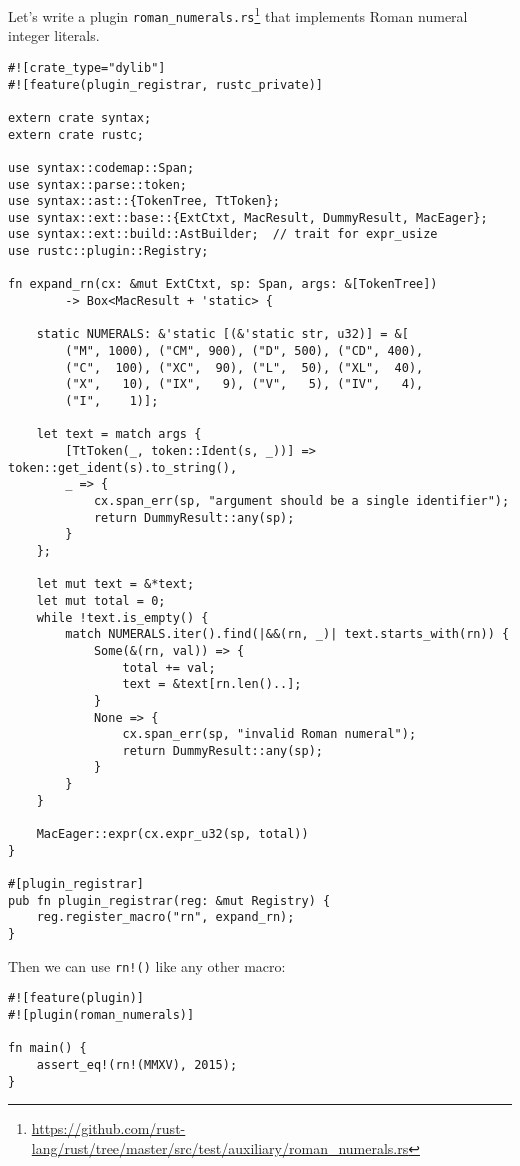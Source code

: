 \documentclass[a4paper,]{book}
\renewcommand{\href}[2]{#2\footnote{\url{#1}}}
\begin{document}
Let's write a plugin
\href{https://github.com/rust-lang/rust/tree/master/src/test/auxiliary/roman_numerals.rs}{\texttt{roman\_numerals.rs}}
that implements Roman numeral integer literals.

\begin{verbatim}
#![crate_type="dylib"]
#![feature(plugin_registrar, rustc_private)]

extern crate syntax;
extern crate rustc;

use syntax::codemap::Span;
use syntax::parse::token;
use syntax::ast::{TokenTree, TtToken};
use syntax::ext::base::{ExtCtxt, MacResult, DummyResult, MacEager};
use syntax::ext::build::AstBuilder;  // trait for expr_usize
use rustc::plugin::Registry;

fn expand_rn(cx: &mut ExtCtxt, sp: Span, args: &[TokenTree])
        -> Box<MacResult + 'static> {

    static NUMERALS: &'static [(&'static str, u32)] = &[
        ("M", 1000), ("CM", 900), ("D", 500), ("CD", 400),
        ("C",  100), ("XC",  90), ("L",  50), ("XL",  40),
        ("X",   10), ("IX",   9), ("V",   5), ("IV",   4),
        ("I",    1)];

    let text = match args {
        [TtToken(_, token::Ident(s, _))] => token::get_ident(s).to_string(),
        _ => {
            cx.span_err(sp, "argument should be a single identifier");
            return DummyResult::any(sp);
        }
    };

    let mut text = &*text;
    let mut total = 0;
    while !text.is_empty() {
        match NUMERALS.iter().find(|&&(rn, _)| text.starts_with(rn)) {
            Some(&(rn, val)) => {
                total += val;
                text = &text[rn.len()..];
            }
            None => {
                cx.span_err(sp, "invalid Roman numeral");
                return DummyResult::any(sp);
            }
        }
    }

    MacEager::expr(cx.expr_u32(sp, total))
}

#[plugin_registrar]
pub fn plugin_registrar(reg: &mut Registry) {
    reg.register_macro("rn", expand_rn);
}
\end{verbatim}

Then we can use \texttt{rn!()} like any other macro:

\begin{verbatim}
#![feature(plugin)]
#![plugin(roman_numerals)]

fn main() {
    assert_eq!(rn!(MMXV), 2015);
}
\end{verbatim}
\end{document}
